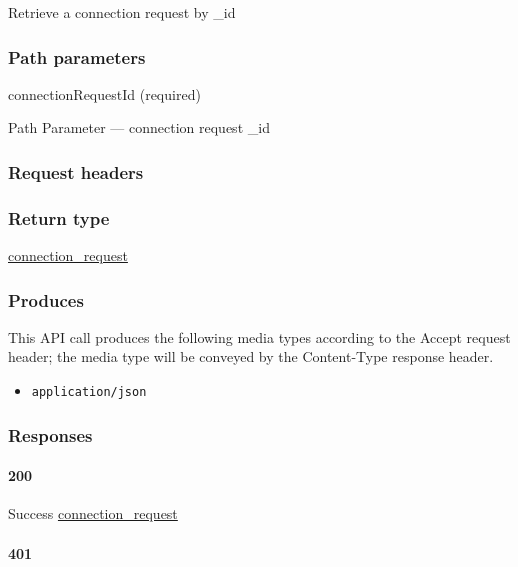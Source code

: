 Retrieve a connection request by \_id

\hypertarget{path-parameters-15}{%
\subsubsection{Path parameters}\label{path-parameters-15}}

connectionRequestId (required)

{Path Parameter} --- connection request \_id

\hypertarget{request-headers-10}{%
\subsubsection{Request headers}\label{request-headers-10}}

\hypertarget{return-type-18}{%
\subsubsection{Return type}\label{return-type-18}}

\protect\hyperlink{connection_request}{connection\_request}

\hypertarget{produces-24}{%
\subsubsection{Produces}\label{produces-24}}

This API call produces the following media types according to the
{Accept} request header; the media type will be conveyed by the
{Content-Type} response header.

\begin{itemize}
\tightlist
\item
  \texttt{application/json}
\end{itemize}

\hypertarget{responses-24}{%
\subsubsection{Responses}\label{responses-24}}

\hypertarget{section-79}{%
\paragraph{200}\label{section-79}}

Success \protect\hyperlink{connection_request}{connection\_request}

\hypertarget{section-80}{%
\paragraph{401}\label{section-80}}

